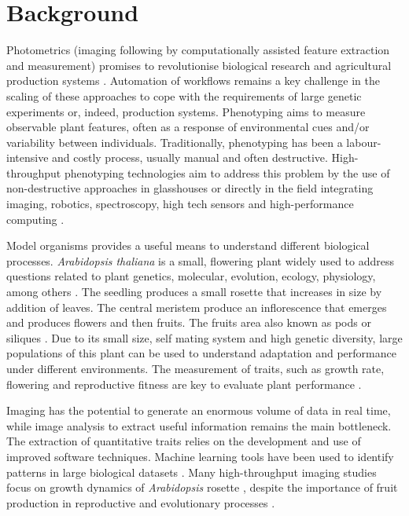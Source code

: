 \documentclass[a4paper,num-refs]{oup-contemporary}
\begin{document}
\section{Background}

Photometrics (imaging following by computationally assisted feature extraction and measurement) promises to revolutionise biological research and agricultural production systems \cite{chen2014dissecting,vasseur2018image,furbank2011phenomics, pauli2016field, shakoor2017high}. Automation of workflows remains a key challenge in the scaling of these approaches to cope with the requirements of large genetic experiments or, indeed, production systems. Phenotyping aims to measure observable plant features, often as a response of environmental cues and/or variability between individuals.  Traditionally, phenotyping has been a labour-intensive and costly process, usually manual and often destructive. High-throughput phenotyping technologies aim to address this problem by the use of non-destructive approaches  in glasshouses \cite{chen2014dissecting, camargo2016determining, vasseur2018image} or directly in the field \cite{pauli2016field, liebisch2015remote} integrating imaging, robotics, spectroscopy, high tech sensors and high-performance computing \cite{singh2016machine,furbank2011phenomics}.

Model organisms provides a useful means to understand different biological processes. \textit{Arabidopsis thaliana} is a small, flowering plant widely used to address questions related to plant genetics, molecular, evolution, ecology, physiology, among others \cite{mitchell2001arabidopsis, koornneef2010development, kramer2015planting}. The seedling produces a small rosette that increases in size by addition of leaves. The central meristem produce an inflorescence that emerges and produces flowers and then fruits. The fruits area also known as pods or siliques \cite{kramer2015planting}. Due to its small size, self mating system and high genetic diversity, large populations of this plant can be used to understand adaptation and performance under different environments. The measurement of traits, such as growth rate, flowering and reproductive fitness are key to evaluate plant performance \cite{reboud2004natural}. 

 Imaging has the potential to generate an enormous volume of data in real time, while image analysis to extract useful information remains the main bottleneck. The extraction of quantitative traits relies on the development and use of improved software techniques. Machine learning tools have been used to identify patterns in large biological datasets \cite{singh2016machine, pape2015utilizing, naik2017real,atkinson2017combining, arinkin2014phenotyping}. Many high-throughput imaging studies focus on growth dynamics of \textit{Arabidopsis} rosette \cite{bac2015genome, bac2016genome, pape2015utilizing, minervini2014image},  despite the importance of fruit production in reproductive and evolutionary processes \cite{vasseur2018image,augustin2016framework,bush2015rna,zheng2014cdkg1}. 
 
\end{document}
